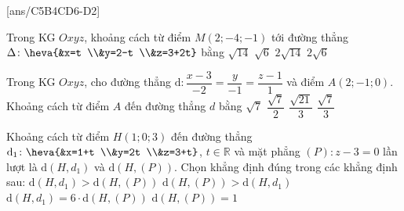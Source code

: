 \TN
{}[ans/C5B4CD6-D2]
\begin{ex}%
	Trong KG $Oxyz$, khoảng cách từ điểm $M(2;-4;-1)$ tới đường thẳng $\Delta\colon \heva{&x=t \\&y=2-t \\&z=3+2t}$ bằng
\choice
{$\sqrt{14}$}
{$\sqrt{6}$}
{\True $2\sqrt{14}$}
{$2\sqrt{6}$}
\end{ex}
\begin{ex}%
	Trong KG $Oxyz$, cho đường thẳng $\mathrm{d}\colon\dfrac{x-3}{-2}=\dfrac{y}{-1}=\dfrac{z-1}{1}$ và điểm $A(2;-1;0)$. Khoảng cách từ điểm $A$ đến đường thẳng $d$ bằng
\choice
{$\sqrt{7}$}
{$\dfrac{\sqrt{7}}{2}$}
{\True $\dfrac{\sqrt{21}}{3}$}
{$\dfrac{\sqrt{7}}{3}$}
\end{ex}
\begin{ex}%
	Khoảng cách từ điểm $H(1;0;3)$ đến đường thẳng $\mathrm{d}_1\colon \heva{&x=1+t \\&y=2t \\&z=3+t}$, $t\in \mathbb{R}$ và mặt phẳng $(P)\colon z-3=0$ lần lượt là $\mathrm{d}(H,d_1)$ và $\mathrm{d}(H,(P))$. Chọn khẳng định đúng trong các khẳng định sau:
	\choice
	{$\mathrm{d}(H,d_1)>\mathrm{d}(H,(P))$}
	{$\mathrm{d}(H,(P))>\mathrm{d}(H,d_1)$}
	{\True $\mathrm{d}(H,d_1)=6\cdot \mathrm{d}(H,(P))$}
	{$\mathrm{d}(H,(P))=1$}
\end{ex}

